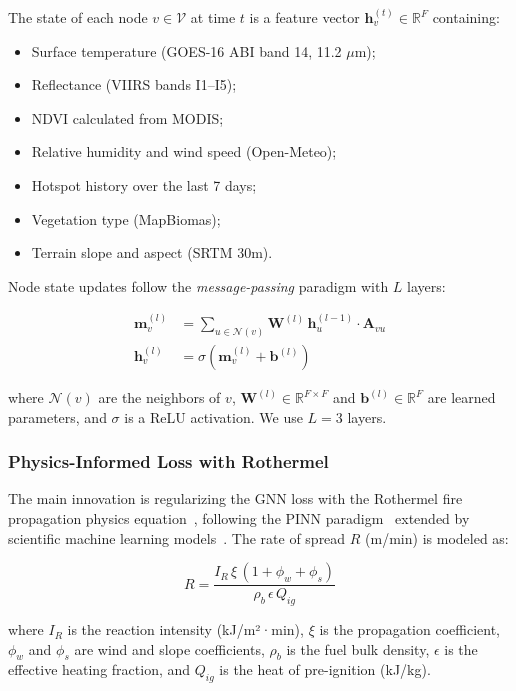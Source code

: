 \documentclass[preprint,12pt,times,numbers]{elsarticle}
\begin{document}
The state of each node $v \in \mathcal{V}$ at time $t$ is a feature vector $\mathbf{h}_v^{(t)} \in \mathbb{R}^{F}$ containing:
\begin{itemize}
    \item Surface temperature (GOES-16 ABI band 14, 11.2 $\mu$m);
    \item Reflectance (VIIRS bands I1--I5);
    \item NDVI calculated from MODIS;
    \item Relative humidity and wind speed (Open-Meteo);
    \item Hotspot history over the last 7 days;
    \item Vegetation type (MapBiomas);
    \item Terrain slope and aspect (SRTM 30m).
\end{itemize}

Node state updates follow the \emph{message-passing} paradigm with $L$ layers:

\begin{align}
\mathbf{m}_v^{(l)} &= \sum_{u \in \mathcal{N}(v)} \mathbf{W}^{(l)} \, \mathbf{h}_u^{(l-1)} \cdot \mathbf{A}_{vu} \label{eq:message} \\
\mathbf{h}_v^{(l)} &= \sigma\left( \mathbf{m}_v^{(l)} + \mathbf{b}^{(l)} \right) \label{eq:update}
\end{align}

where $\mathcal{N}(v)$ are the neighbors of $v$, $\mathbf{W}^{(l)} \in \mathbb{R}^{F \times F}$ and $\mathbf{b}^{(l)} \in \mathbb{R}^{F}$ are learned parameters, and $\sigma$ is a ReLU activation. We use $L = 3$ layers.

\subsubsection{Physics-Informed Loss with Rothermel}

The main innovation is regularizing the GNN loss with the Rothermel fire propagation physics equation~\cite{article:rothermel1972}, following the PINN paradigm~\cite{article:raissi2019} extended by scientific machine learning models~\cite{article:karniadakis2021,article:lu2021deepxde,article:cuomo2022}. The rate of spread $R$ (m/min) is modeled as:

\begin{equation}
R = \frac{I_R \, \xi \, (1 + \phi_w + \phi_s)}{\rho_b \, \epsilon \, Q_{ig}}
\label{eq:rothermel}
\end{equation}

where $I_R$ is the reaction intensity (kJ/m²·min), $\xi$ is the propagation coefficient, $\phi_w$ and $\phi_s$ are wind and slope coefficients, $\rho_b$ is the fuel bulk density, $\epsilon$ is the effective heating fraction, and $Q_{ig}$ is the heat of pre-ignition (kJ/kg).
\end{document}
